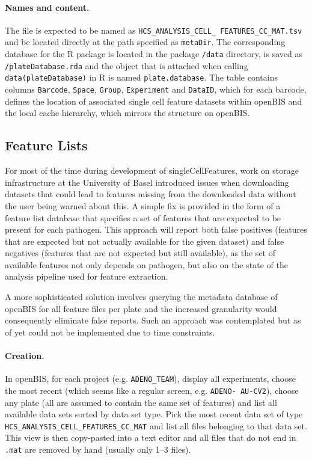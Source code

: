 \paragraph{Names and content.}
The file is expected to be named as \texttt{HCS_ANALYSIS_CELL_ FEATURES_CC_MAT.tsv} and be located directly at the path specified as \texttt{metaDir}. The corresponding database for the R package is located in the package \texttt{/data} directory, is saved as \texttt{/plateDatabase.rda} and the object that is attached when calling \texttt{data(plateDatabase)} in R is named \texttt{plate.database}. The table contains columns \texttt{Barcode}, \texttt{Space}, \texttt{Group}, \texttt{Experiment} and \texttt{DataID}, which for each barcode, defines the location of associated single cell feature datasets within openBIS and the local cache hierarchy, which mirrors the structure on openBIS.

\subsection{Feature Lists}
\label{sec:feature-lists}
For most of the time during development of singleCellFeatures, work on storage infrastructure at the University of Basel introduced issues when downloading datasets that could lead to features missing from the downloaded data without the user being warned about this. A simple fix is provided in the form of a feature list database that specifies a set of features that are expected to be present for each pathogen. This approach will report both false positives (features that are expected but not actually available for the given dataset) and false negatives (features that are not expected but still available), as the set of available features not only depends on pathogen, but also on the state of the analysis pipeline used for feature extraction.

A more sophisticated solution involves querying the metadata database of openBIS for all feature files per plate and the increased granularity would consequently eliminate false reports. Such an approach was contemplated but as of yet could not be implemented due to time constraints.

\paragraph{Creation.}
In openBIS, for each project (e.g. \texttt{ADENO_TEAM}), display all experiments, choose the most recent (which seems like a regular screen, e.g. \texttt{ADENO- AU-CV2}), choose any plate (all are assumed to contain the same set of features) and list all available data sets sorted by data set type. Pick the most recent data set of type \texttt{HCS_ANALYSIS_CELL_FEATURES_CC_MAT} and list all files belonging to that data set. This view is then copy-pasted into a text editor and all files that do not end in \texttt{.mat} are removed by hand (usually only 1--3 files).

